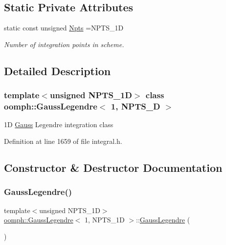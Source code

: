 \subsection*{Static Private Attributes}
\begin{DoxyCompactItemize}
\item 
static const unsigned \hyperlink{classoomph_1_1GaussLegendre_3_011_00_01NPTS__1D_01_4_ac84ac1ef6d2afb4be37107c122bdf84a}{Npts} =N\+P\+T\+S\+\_\+1D
\begin{DoxyCompactList}\small\item\em Number of integration points in scheme. \end{DoxyCompactList}\end{DoxyCompactItemize}


\subsection{Detailed Description}
\subsubsection*{template$<$unsigned N\+P\+T\+S\+\_\+1D$>$\newline
class oomph\+::\+Gauss\+Legendre$<$ 1, N\+P\+T\+S\+\_\+D $>$}

1D \hyperlink{classoomph_1_1Gauss}{Gauss} Legendre integration class 

Definition at line 1659 of file integral.\+h.



\subsection{Constructor \& Destructor Documentation}
\mbox{\label{classoomph_1_1GaussLegendre_3_011_00_01NPTS__1D_01_4_a3b66c486cf487307e25bb3260e35e312}} 
\subsubsection{\texorpdfstring{Gauss\+Legendre()}{GaussLegendre()}}
{\footnotesize\ttfamily template$<$unsigned N\+P\+T\+S\+\_\+1D$>$ \\
\hyperlink{classoomph_1_1GaussLegendre}{oomph\+::\+Gauss\+Legendre}$<$ 1, N\+P\+T\+S\+\_\+1D $>$\+::\hyperlink{classoomph_1_1GaussLegendre}{Gauss\+Legendre} (\begin{DoxyParamCaption}{ }\end{DoxyParamCaption})}



